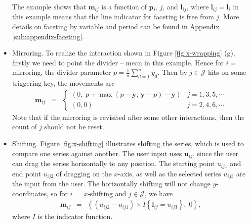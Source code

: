 \documentclass[12pt]{article}
\begin{document}
\begin{itemize}
The example shows that $\mathbf{m}{}_{ij}$ is a function of $\mathbf{p}{}_{i}$,
$j$, and $\mathbf{l}_{ij}$, where $\mathbf{l}_{ij}=\mathbf{l}{}_i$ in this example
means that the line indicator for faceting is free from $j$.
More details on faceting by variable and period can be
found in Appendix \ref{sub:appendix-faceting}.



\item Mirroring. To realize the interaction shown in Figure \ref{fig:x-wrapping} (g),
firstly we need to point the divider -- mean in this example.
Hence for $i=$ mirroring, the divider parameter
$p = \frac{1}{n}\sum_{d=1}^{n}y_d$. Then by $j\in\mathcal{J}$
hits on some triggering key, the movements are
\begin{eqnarray*}
\mathbf{m}{}_{ij} & = & \begin{cases}
(0, \; p+\max(p-\mathbf{y},\,\mathbf{y}-p)-\mathbf{y}) & j=1,3,5,\cdots \\
(0,0) & j=2,4,6,\cdots
\end{cases}
\end{eqnarray*}
Note that if the mirroring is revisited after some other interactions,
then the count of $j$ should not be reset.


\item Shifting. Figure \ref{fig:x-shifting} illustrates
shifting the series, which is used to compare one series
against another. The user input uses $\mathbf{u}{}_{ij}$,
since the user can drag the
series horizontally to any position. The starting point
$u_{ij1}$ and end point $u_{ij2}$ of dragging on the $x$-axis,
as well as the selected series $u_{ij3}$ are the input from the user.
The horizontally shifting will not change $y$-coordinates, so for
$i=$ $x$-shifting and $j\in\mathcal{J}$, we have
\begin{eqnarray*}
\mathbf{m}{}_{ij} & = &
((u_{ij2}-u_{ij1})\times I\left\{ \mathbf{l}{}_{ij}=u_{ij3}\right\}, \; 0),
\end{eqnarray*}
where $I$ is the indicator function.

\end{itemize}
\end{document}
